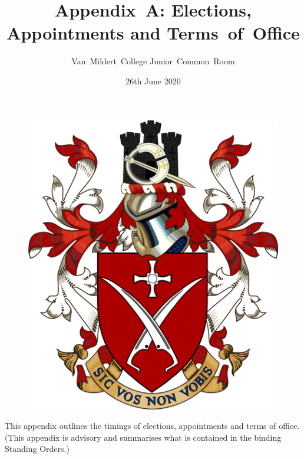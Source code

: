 \documentclass[12pt]{article}
\title{Appendix~A: Elections, Appointments and Terms~of~Office}
\author{Van~Mildert~College Junior~Common~Room}
\date{26th June 2020}
\begin{document}
    \begin{titlepage}  %
        \maketitle
        \begin{figure}[h]
            \includegraphics[scale=0.25]{arms}  %
            \centering
        \end{figure}
        \thispagestyle{empty}
    \end{titlepage}
    \setcounter{page}{2}  %

    This appendix outlines the timings of elections, appointments and terms of office.\\
    (This appendix is advisory and summarises what is contained in the binding Standing Orders.)
\end{document}
